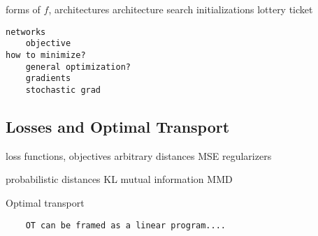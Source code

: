 forms of $f$, architectures
	architecture search
	initializations
		lottery ticket
		


\begin{verbatim}
networks
    objective
how to minimize?
    general optimization?
    gradients
    stochastic grad
\end{verbatim}

\subsection{Losses and Optimal Transport}
loss functions, objectives
arbitrary distances
MSE
regularizers

probabilistic distances
KL
mutual information
MMD

Optimal transport	
\begin{verbatim}
    OT can be framed as a linear program....
\end{verbatim}
    
